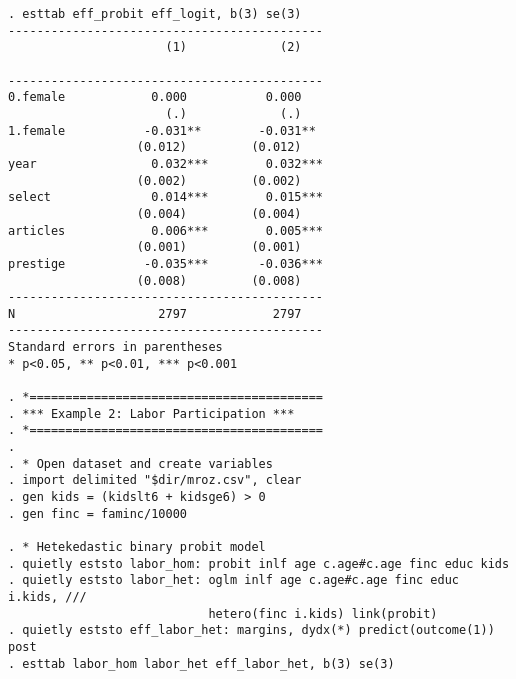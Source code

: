 \begin{verbatim}
. esttab eff_probit eff_logit, b(3) se(3)
--------------------------------------------
                      (1)             (2)   
                                            
--------------------------------------------
0.female            0.000           0.000   
                      (.)             (.)   
1.female           -0.031**        -0.031** 
                  (0.012)         (0.012)   
year                0.032***        0.032***
                  (0.002)         (0.002)   
select              0.014***        0.015***
                  (0.004)         (0.004)   
articles            0.006***        0.005***
                  (0.001)         (0.001)   
prestige           -0.035***       -0.036***
                  (0.008)         (0.008)   
--------------------------------------------
N                    2797            2797   
--------------------------------------------
Standard errors in parentheses
* p<0.05, ** p<0.01, *** p<0.001

. *=========================================
. *** Example 2: Labor Participation ***
. *=========================================
. 
. * Open dataset and create variables
. import delimited "$dir/mroz.csv", clear 
. gen kids = (kidslt6 + kidsge6) > 0
. gen finc = faminc/10000

. * Hetekedastic binary probit model
. quietly eststo labor_hom: probit inlf age c.age#c.age finc educ kids
. quietly eststo labor_het: oglm inlf age c.age#c.age finc educ i.kids, ///
                            hetero(finc i.kids) link(probit)
. quietly eststo eff_labor_het: margins, dydx(*) predict(outcome(1)) post
. esttab labor_hom labor_het eff_labor_het, b(3) se(3)


\end{verbatim}
